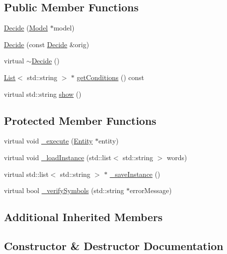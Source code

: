 \subsection*{Public Member Functions}
\begin{DoxyCompactItemize}
\item 
\hyperlink{class_decide_a7b3204637542be0a55c59e1396fae40b}{Decide} (\hyperlink{class_model}{Model} $\ast$model)
\item 
\hyperlink{class_decide_a5fe15a38389b322aa60c0862dae86b9b}{Decide} (const \hyperlink{class_decide}{Decide} \&orig)
\item 
virtual \hyperlink{class_decide_a2570a0531aa97aa29284a475d2929c1c}{$\sim$\+Decide} ()
\item 
\hyperlink{class_list}{List}$<$ std\+::string $>$ $\ast$ \hyperlink{class_decide_a6c9a4f0acff3d9f31568c0e5e966c86c}{get\+Conditions} () const 
\item 
virtual std\+::string \hyperlink{class_decide_a19e2a1143403795bcfd83903a1c0f695}{show} ()
\end{DoxyCompactItemize}
\subsection*{Protected Member Functions}
\begin{DoxyCompactItemize}
\item 
virtual void \hyperlink{class_decide_a873773c9e74e15a4dae52ef11c43b96c}{\+\_\+execute} (\hyperlink{class_entity}{Entity} $\ast$entity)
\item 
virtual void \hyperlink{class_decide_a0e6cfd81dd2a1aae9ae06a02ac86f201}{\+\_\+load\+Instance} (std\+::list$<$ std\+::string $>$ words)
\item 
virtual std\+::list$<$ std\+::string $>$ $\ast$ \hyperlink{class_decide_ae628db01a2a5583893bec28cc43fa29a}{\+\_\+save\+Instance} ()
\item 
virtual bool \hyperlink{class_decide_ac32726d32e89467a5c9a28e1af57f401}{\+\_\+verify\+Symbols} (std\+::string $\ast$error\+Message)
\end{DoxyCompactItemize}
\subsection*{Additional Inherited Members}


\subsection{Constructor \& Destructor Documentation}

